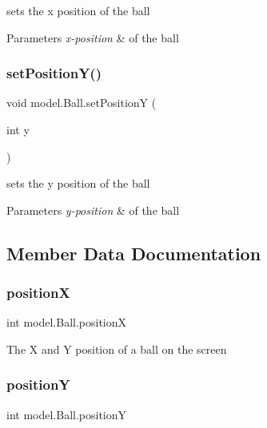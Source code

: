 sets the x position of the ball 


\begin{DoxyParams}{Parameters}
{\em x-\/position} & of the ball \\
\hline
\end{DoxyParams}
\hypertarget{classmodel_1_1_ball_a8902ffdc71a7845ec246fedf586649c7}{}\label{classmodel_1_1_ball_a8902ffdc71a7845ec246fedf586649c7} 
\subsubsection{\texorpdfstring{set\+Position\+Y()}{setPositionY()}}
{\footnotesize\ttfamily void model.\+Ball.\+set\+PositionY (\begin{DoxyParamCaption}\item[{int}]{y }\end{DoxyParamCaption})}



sets the y position of the ball 


\begin{DoxyParams}{Parameters}
{\em y-\/position} & of the ball \\
\hline
\end{DoxyParams}


\subsection{Member Data Documentation}
\hypertarget{classmodel_1_1_ball_a706c12dfbaabd03b8423ff2bdde0f5c9}{}\label{classmodel_1_1_ball_a706c12dfbaabd03b8423ff2bdde0f5c9} 
\subsubsection{\texorpdfstring{positionX}{positionX}}
{\footnotesize\ttfamily int model.\+Ball.\+positionX\hspace{0.3cm}{\ttfamily [private]}}

The X and Y position of a ball on the screen \hypertarget{classmodel_1_1_ball_aac5d95f10dd849f8cea43c34300d9649}{}\label{classmodel_1_1_ball_aac5d95f10dd849f8cea43c34300d9649} 
\subsubsection{\texorpdfstring{positionY}{positionY}}
{\footnotesize\ttfamily int model.\+Ball.\+positionY\hspace{0.3cm}{\ttfamily [private]}}

